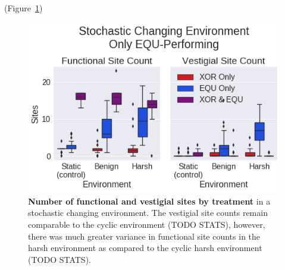 \documentclass[letterpaper]{article}
\begin{document}
(Figure~\ref{fig:CSE_func_vestigial})

\begin{figure}[h!]
\begin{center}
\includegraphics[trim={0 0 0 0}, clip, width=1\columnwidth]{figures/CSE_func_vest__filtered__box.png}
\caption{\textbf{Number of functional and vestigial sites by treatment} in a stochastic changing environment. The vestigial site counts remain comparable to the cyclic environment (TODO STATS), however, there was much greater variance in functional site counts in the harsh environment as compared to the cyclic harsh environment (TODO STATS).%
}
\label{fig:CSE_func_vestigial} %
\end{center}
\end{figure}
\end{document}
